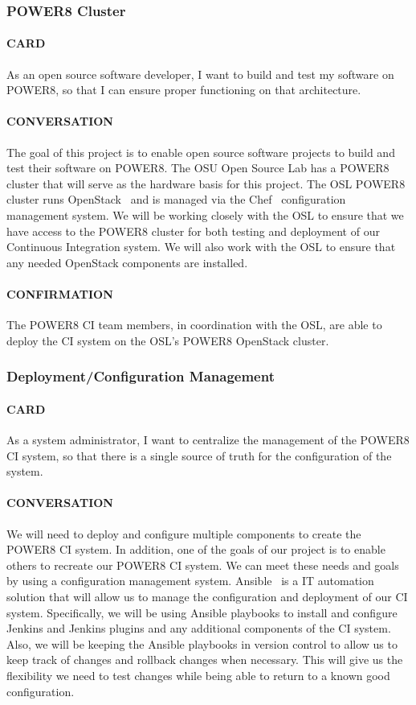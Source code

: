 \documentclass[10pt,letterpaper,onecolumn,draftclsnofoot]{IEEEtran}
\begin{document}
\subsubsection{POWER8 Cluster}
\paragraph{CARD}
As an open source software developer, I want to build and test my software on POWER8, so that I can ensure proper functioning on that architecture.
\paragraph{CONVERSATION}
The goal of this project is to enable open source software projects to build and test their software on POWER8.
The OSU Open Source Lab has a POWER8 cluster that will serve as the hardware basis for this project.
The OSL POWER8 cluster runs OpenStack~\cite{openstackmain} and is managed via the Chef~\cite{chefmain} configuration management system.
We will be working closely with the OSL to ensure that we have access to the POWER8 cluster for both testing and deployment of our Continuous Integration system.
We will also work with the OSL to ensure that any needed OpenStack components are installed.
\paragraph{CONFIRMATION}
The POWER8 CI team members, in coordination with the OSL, are able to deploy the CI system on the OSL's POWER8 OpenStack cluster.

\subsubsection{Deployment/Configuration Management}
\paragraph{CARD}
As a system administrator, I want to centralize the management of the POWER8 CI system, so that there is a single source of truth for the configuration of the system.
\paragraph{CONVERSATION}
We will need to deploy and configure multiple components to create the POWER8 CI system.
In addition, one of the goals of our project is to enable others to recreate our POWER8 CI system.
We can meet these needs and goals by using a configuration management system.
Ansible~\cite{ansiblemain} is a IT automation solution that will allow us to manage the configuration and deployment of our CI system.
Specifically, we will be using Ansible playbooks to install and configure Jenkins and Jenkins plugins and any additional components of the CI system.
Also, we will be keeping the Ansible playbooks in version control to allow us to keep track of changes and rollback changes when necessary.
This will give us the flexibility we need to test changes while being able to return to a known good configuration.
\end{document}
